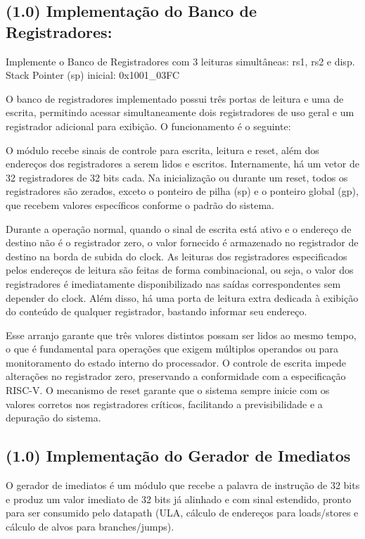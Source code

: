 \documentclass[12pt,a4paper]{article}
\begin{document}
\subsection{(1.0) Implementação do Banco de Registradores: } Implemente o Banco de Registradores com 3 leituras simultâneas: rs1, rs2 e disp.
Stack Pointer (sp) inicial: 0x1001_03FC


O banco de registradores implementado possui três portas de leitura e uma de escrita, permitindo acessar simultaneamente dois registradores de uso geral e um registrador adicional para exibição. O funcionamento é o seguinte:

O módulo recebe sinais de controle para escrita, leitura e reset, além dos endereços dos registradores a serem lidos e escritos. Internamente, há um vetor de 32 registradores de 32 bits cada. Na inicialização ou durante um reset, todos os registradores são zerados, exceto o ponteiro de pilha (sp) e o ponteiro global (gp), que recebem valores específicos conforme o padrão do sistema.

Durante a operação normal, quando o sinal de escrita está ativo e o endereço de destino não é o registrador zero, o valor fornecido é armazenado no registrador de destino na borda de subida do clock. As leituras dos registradores especificados pelos endereços de leitura são feitas de forma combinacional, ou seja, o valor dos registradores é imediatamente disponibilizado nas saídas correspondentes sem depender do clock. Além disso, há uma porta de leitura extra dedicada à exibição do conteúdo de qualquer registrador, bastando informar seu endereço.

Esse arranjo garante que três valores distintos possam ser lidos ao mesmo tempo, o que é fundamental para operações que exigem múltiplos operandos ou para monitoramento do estado interno do processador. O controle de escrita impede alterações no registrador zero, preservando a conformidade com a especificação RISC-V. O mecanismo de reset garante que o sistema sempre inicie com os valores corretos nos registradores críticos, facilitando a previsibilidade e a depuração do sistema.

\subsection{(1.0) Implementação do Gerador de Imediatos}

O gerador de imediatos é um módulo que recebe a palavra de instrução de 32 bits e produz um valor imediato de 32 bits já alinhado e com sinal estendido, pronto para ser consumido pelo datapath (ULA, cálculo de endereços para loads/stores e cálculo de alvos para branches/jumps).
\end{document}
